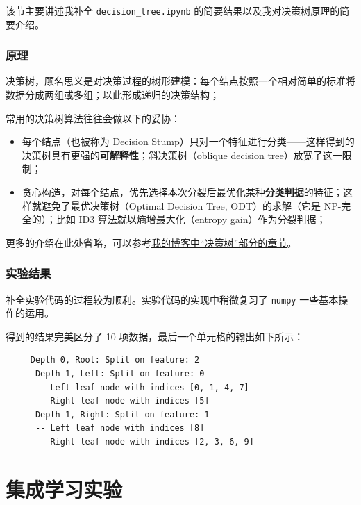 \documentclass[oneside]{ctexbook}
\begin{document}
该节主要讲述我补全 \verb|decision_tree.ipynb| 的简要结果以及我对决策树原理的简要介绍。

\subsection{原理}

决策树，顾名思义是对决策过程的树形建模：每个结点按照一个相对简单的标准将数据分成两组或多组；以此形成递归的决策结构；

常用的决策树算法往往会做以下的妥协：

\begin{itemize}
    \item 每个结点（也被称为 Decision Stump）只对一个特征进行分类——这样得到的决策树具有更强的{\bf 可解释性}；斜决策树（oblique decision tree）放宽了这一限制；
    \item 贪心构造，对每个结点，优先选择本次分裂后最优化某种{\bf 分类判据}的特征；这样就避免了最优决策树（Optimal Decision Tree, ODT）的求解（它是 NP-完全的）；比如 ID3 算法就以熵增最大化（entropy gain）作为分裂判据；
\end{itemize}

更多的介绍在此处省略，可以参考\href{https://xinchengo.github.io/blog-zh/2025/12/23/%E6%94%AF%E6%8C%81%E5%90%91%E9%87%8F%E6%9C%BA%E5%86%B3%E7%AD%96%E6%A0%91%E4%B8%8E%E9%9B%86%E6%88%90%E5%AD%A6%E4%B9%A0/#%E5%86%B3%E7%AD%96%E6%A0%91}{我的博客中“决策树”部分的章节}。

\subsection{实验结果}

补全实验代码的过程较为顺利。实验代码的实现中稍微复习了 \verb|numpy| 一些基本操作的运用。

得到的结果完美区分了 10 项数据，最后一个单元格的输出如下所示：

\begin{verbatim}
     Depth 0, Root: Split on feature: 2
    - Depth 1, Left: Split on feature: 0
      -- Left leaf node with indices [0, 1, 4, 7]
      -- Right leaf node with indices [5]
    - Depth 1, Right: Split on feature: 1
      -- Left leaf node with indices [8]
      -- Right leaf node with indices [2, 3, 6, 9]
\end{verbatim}

\chapter{集成学习实验}
\end{document}
